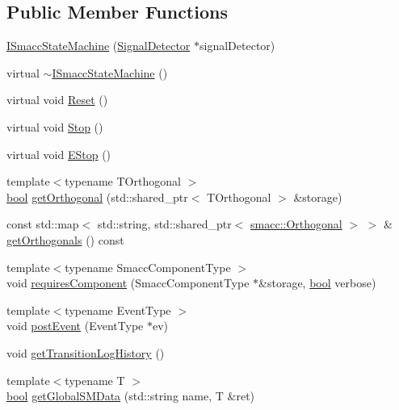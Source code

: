 \subsection*{Public Member Functions}
\begin{DoxyCompactItemize}
\item 
\hyperlink{classsmacc_1_1ISmaccStateMachine_a497c2185584adbec3298d4000277b75e}{I\+Smacc\+State\+Machine} (\hyperlink{classsmacc_1_1SignalDetector}{Signal\+Detector} $\ast$signal\+Detector)
\item 
virtual \hyperlink{classsmacc_1_1ISmaccStateMachine_a54bb9bac0008d3efc6a50cce88dce48e}{$\sim$\+I\+Smacc\+State\+Machine} ()
\item 
virtual void \hyperlink{classsmacc_1_1ISmaccStateMachine_ae175edef7aba48a1ac82e8401632c5fa}{Reset} ()
\item 
virtual void \hyperlink{classsmacc_1_1ISmaccStateMachine_a8f353fcf0686b1dacb57458da882c89b}{Stop} ()
\item 
virtual void \hyperlink{classsmacc_1_1ISmaccStateMachine_a3c5aab001d1bb7edcb37413404e4a7c2}{E\+Stop} ()
\item 
{\footnotesize template$<$typename T\+Orthogonal $>$ }\\\hyperlink{classbool}{bool} \hyperlink{classsmacc_1_1ISmaccStateMachine_a66a6732a48dbc0bc7a95b57fba5ec980}{get\+Orthogonal} (std\+::shared\+\_\+ptr$<$ T\+Orthogonal $>$ \&storage)
\item 
const std\+::map$<$ std\+::string, std\+::shared\+\_\+ptr$<$ \hyperlink{classsmacc_1_1Orthogonal}{smacc\+::\+Orthogonal} $>$ $>$ \& \hyperlink{classsmacc_1_1ISmaccStateMachine_a262b3f2d15af019190fa69b7c0df00f8}{get\+Orthogonals} () const 
\item 
{\footnotesize template$<$typename Smacc\+Component\+Type $>$ }\\void \hyperlink{classsmacc_1_1ISmaccStateMachine_a729d0bcb3c4894e33f0696e0b1aeb155}{requires\+Component} (Smacc\+Component\+Type $\ast$\&storage, \hyperlink{classbool}{bool} verbose)
\item 
{\footnotesize template$<$typename Event\+Type $>$ }\\void \hyperlink{classsmacc_1_1ISmaccStateMachine_ad80cdd7bbc9a9f3b221c625754fed1ed}{post\+Event} (Event\+Type $\ast$ev)
\item 
void \hyperlink{classsmacc_1_1ISmaccStateMachine_ae7c08fc2addf8ee4785f721050e6a763}{get\+Transition\+Log\+History} ()
\item 
{\footnotesize template$<$typename T $>$ }\\\hyperlink{classbool}{bool} \hyperlink{classsmacc_1_1ISmaccStateMachine_aeda2d6813c6c428bf318a5792e014b61}{get\+Global\+S\+M\+Data} (std\+::string name, T \&ret)

\end{DoxyCompactItemize}
